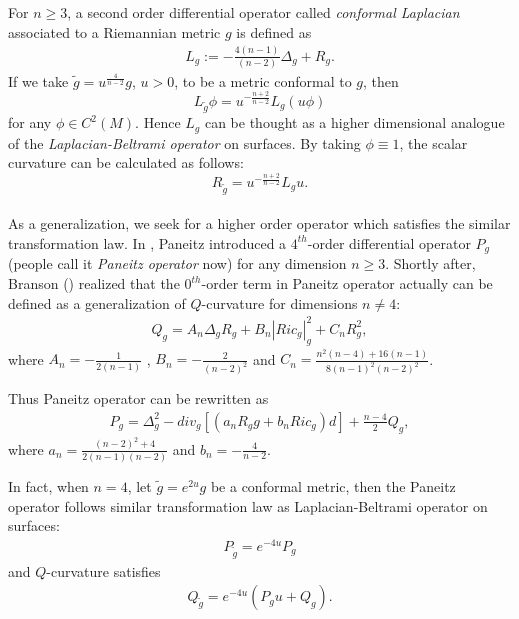 \documentclass[12pt]{amsart}
\theoremstyle{definition}
\theoremstyle{remark}
\numberwithin{equation}{section}
\begin{document}
For $n\geq 3$, a second order differential operator called \emph{conformal Laplacian} associated to a  Riemannian metric $g$ is defined as
\begin{align}
L_{g}:=-\frac{4(n-1)}{(n-2)}\Delta_{g} + R_{g}.
\end{align}
If we take $\tilde{g}=u^{\frac{4}{n-2}}g$, $u>0$, to be a metric conformal to $g$, then 
\begin{equation}
L_{\tilde{g}}\phi = u^{-\frac{n+2}{n-2}}L_{g}(u\phi)
\end{equation}
for any $\phi \in C^2(M)$. Hence $L_g$ can be thought as a higher dimensional analogue of the \emph{Laplacian-Beltrami operator} on surfaces. By taking $\phi \equiv 1$, the scalar curvature can be calculated as follows:
\begin{equation}
R_{\tilde{g}} =u^{-\frac{n+2}{n-2}} L_{g}u.
\end{equation}\\

As a generalization, we seek for a higher order operator which satisfies the similar transformation law. In \cite{Paneitz}, Paneitz introduced a $4^{th}$-order differential operator $P_g$ (people call it \emph{Paneitz operator} now) for any dimension $n \geq 3$. Shortly after, Branson (\cite{Branson}) realized that the $0^{th}$-order term in Paneitz operator actually can be defined as a generalization of $Q$-curvature for dimensions $n\neq 4$:
\begin{align}
Q_{g} = A_n \Delta_{g} R_{g} + B_n |Ric_{g}|_{g}^2 + C_nR_{g}^2,
\end{align}
where $A_n = - \frac{1}{2(n-1)}$ , $B_n = - \frac{2}{(n-2)^2}$ and
$C_n = \frac{n^2(n-4) + 16 (n-1)}{8(n-1)^2(n-2)^2}$.

Thus Paneitz operator can be rewritten as 
\begin{align}
P_g = \Delta_g^2 - div_g \left[(a_n R_g g + b_n Ric_g) d\right] + \frac{n-4}{2}Q_g,
\end{align}
where $a_n = \frac{(n-2)^2 + 4}{2(n-1)(n-2)}$ and $b_n = - \frac{4}{n-2}$.

In fact, when $n=4$, let $\tilde{g} = e^{2u} g$ be a conformal metric, then the Paneitz operator follows similar transformation law as Laplacian-Beltrami operator on surfaces:
\begin{align}
P_{\tilde{g}} = e^{-4u}P_g
\end{align}
and $Q$-curvature satisfies
\begin{align}\label{eqn:conf_Q_4}
Q_{\tilde{g}} =  e^{-4u} \left(P_g u + Q_g \right).
\end{align}
\end{document}
